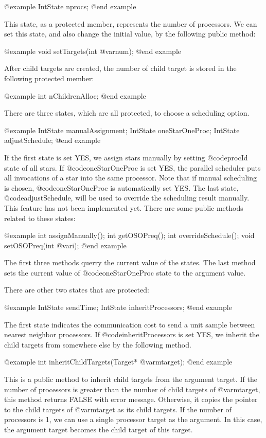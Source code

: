 @example
IntState nprocs;
@end example

This state, as a protected member, represents the number of processors.
We can set this state, and also change the initial value, by the following 
public method:

@example
void setTargets(int @var{num});
@end example

After child targets are created, the number of child target is stored in
the following protected member:

@example
int nChildrenAlloc;
@end example

There are three states, which are all protected, to choose a scheduling option.

@example
IntState manualAssignment;
IntState oneStarOneProc;
IntState adjustSchedule;
@end example

If the first state is set YES, we assign stars manually by setting
@code{procId} state of all stars. If @code{oneStarOneProc} is set YES,
the parallel scheduler puts all invocations of a star into the same
processor. Note that if manual scheduling is chosen, @code{oneStarOneProc}
is automatically set YES. The last state, @code{adjustSchedule}, will be
used to override the scheduling result manually. This feature has not been
implemented yet. There are some public methods related to these states:

@example
int assignManually();
int getOSOPreq();
int overrideSchedule();
void setOSOPreq(int @var{i});
@end example

The first three methods querry the current value of the states. The last
method sets the current value of @code{oneStarOneProc} state to the
argument value.

There are other two states that are protected:

@example
IntState sendTime;
IntState inheritProcessors;
@end example

The first state indicates the communication cost to send a unit sample
between nearest neighbor processors. If @code{inheritProcessors} is set YES,
we inherit the child targets from somewhere else by the following method.

@example
int inheritChildTargets(Target* @var{mtarget});
@end example

This is a public method to inherit child targets from the argument target.
If the number of processors is greater than the number of child targets
of @var{mtarget}, this method returns FALSE with error message. Otherwise,
it copies the pointer to the child targets of @var{mtarget} as its child
targets. If the number of processors is 1, we can use a single processor
target as the argument. In this case, the argument target becomes the child
target of this target.

